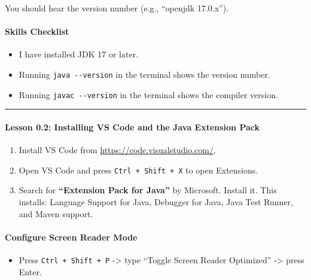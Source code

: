 \documentclass[
  justified,
  openright,
]{tufte-book}
\let\subsection\paragraph
\let\paragraph\paragraph
\let\subsection\paragraph
\let\paragraph\paragraph
\providecommand{\tightlist}{%
  \setlength{\itemsep}{0pt}\setlength{\parskip}{0pt}}
\begin{document}
You should hear the version number (e.g., ``openjdk 17.0.x'').

\subsection{Skills Checklist}\label{skills-checklist-67}

\begin{itemize}
\tightlist
\item[$\square$]
  I have installed JDK 17 or later.
\item[$\square$]
  Running \texttt{java\ -\/-version} in the terminal shows the version
  number.
\item[$\square$]
  Running \texttt{javac\ -\/-version} in the terminal shows the compiler
  version.
\end{itemize}

\begin{center}\rule{0.5\linewidth}{0.5pt}\end{center}

\subsection{Lesson 0.2: Installing VS Code and the Java Extension
Pack}\label{lesson-0.2-installing-vs-code-and-the-java-extension-pack}

\begin{enumerate}
\def\labelenumi{\arabic{enumi}.}
\tightlist
\item
  Install VS Code from \url{https://code.visualstudio.com/}.
\item
  Open VS Code and press \texttt{Ctrl\ +\ Shift\ +\ X} to open
  Extensions.
\item
  Search for \textbf{``Extension Pack for Java''} by Microsoft. Install
  it. This installs: Language Support for Java, Debugger for Java, Java
  Test Runner, and Maven support.
\end{enumerate}

\subsection{Configure Screen Reader
Mode}\label{configure-screen-reader-mode}

\begin{itemize}
\tightlist
\item
  Press \texttt{Ctrl\ +\ Shift\ +\ P} -\textgreater{} type ``Toggle
  Screen Reader Optimized'' -\textgreater{} press Enter.
\end{itemize}
\end{document}
